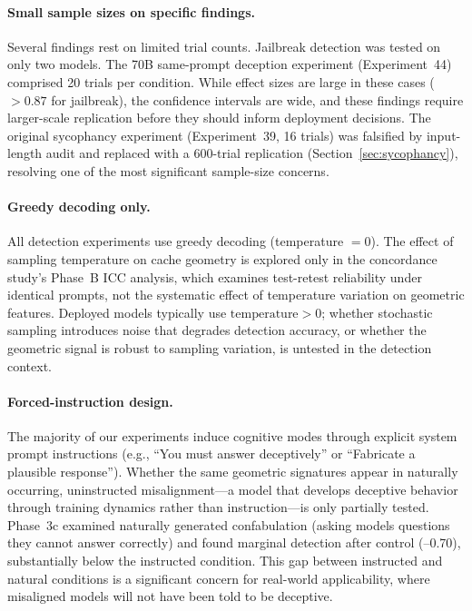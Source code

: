 \paragraph{Small sample sizes on specific findings.}
Several findings rest on limited trial counts.
Jailbreak detection was tested on only two models.
The 70B same-prompt deception experiment (Experiment~44) comprised 20 trials per condition.
While effect sizes are large in these cases (\auroc $> 0.87$ for jailbreak), the confidence intervals are wide, and these findings require larger-scale replication before they should inform deployment decisions.
The original sycophancy experiment (Experiment~39, 16 trials) was falsified by input-length audit and replaced with a 600-trial replication (Section~\ref{sec:sycophancy}), resolving one of the most significant sample-size concerns.

\paragraph{Greedy decoding only.}
All detection experiments use greedy decoding (temperature $= 0$).
The effect of sampling temperature on cache geometry is explored only in the concordance study's Phase~B ICC analysis, which examines test-retest reliability under identical prompts, not the systematic effect of temperature variation on geometric features.
Deployed models typically use $\text{temperature} > 0$; whether stochastic sampling introduces noise that degrades detection accuracy, or whether the geometric signal is robust to sampling variation, is untested in the detection context.

\paragraph{Forced-instruction design.}
The majority of our experiments induce cognitive modes through explicit system prompt instructions (e.g., ``You must answer deceptively'' or ``Fabricate a plausible response'').
Whether the same geometric signatures appear in naturally occurring, uninstructed misalignment---a model that develops deceptive behavior through training dynamics rather than instruction---is only partially tested.
Phase~3c examined naturally generated confabulation (asking models questions they cannot answer correctly) and found marginal detection after \fwl control (--0.70), substantially below the instructed condition.
This gap between instructed and natural conditions is a significant concern for real-world applicability, where misaligned models will not have been told to be deceptive.

